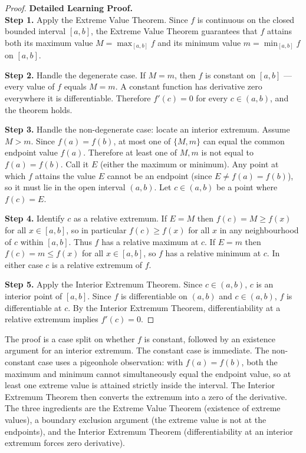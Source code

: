 \begin{proof}
\textbf{Detailed Learning Proof.}~\\

\textbf{Step 1.} Apply the Extreme Value Theorem. Since $f$ is continuous on the closed bounded interval $[a,b]$, the Extreme Value Theorem guarantees that $f$ attains both its maximum value $M = \max_{[a,b]} f$ and its minimum value $m = \min_{[a,b]} f$ on $[a,b]$.

\textbf{Step 2.} Handle the degenerate case. If $M = m$, then $f$ is constant on $[a,b]$ --- every value of $f$ equals $M = m$. A constant function has derivative zero everywhere it is differentiable. Therefore $f'(c) = 0$ for every $c \in (a,b)$, and the theorem holds.

\textbf{Step 3.} Handle the non-degenerate case: locate an interior extremum. Assume $M > m$. Since $f(a) = f(b)$, at most one of $\{M, m\}$ can equal the common endpoint value $f(a)$. Therefore at least one of $M, m$ is not equal to $f(a) = f(b)$. Call it $E$ (either the maximum or minimum). Any point at which $f$ attains the value $E$ cannot be an endpoint (since $E \neq f(a) = f(b)$), so it must lie in the open interval $(a,b)$. Let $c \in (a,b)$ be a point where $f(c) = E$.

\textbf{Step 4.} Identify $c$ as a relative extremum. If $E = M$ then $f(c) = M \geq f(x)$ for all $x \in [a,b]$, so in particular $f(c) \geq f(x)$ for all $x$ in any neighbourhood of $c$ within $[a,b]$. Thus $f$ has a relative maximum at $c$. If $E = m$ then $f(c) = m \leq f(x)$ for all $x \in [a,b]$, so $f$ has a relative minimum at $c$. In either case $c$ is a relative extremum of $f$.

\textbf{Step 5.} Apply the Interior Extremum Theorem. Since $c \in (a,b)$, $c$ is an interior point of $[a,b]$. Since $f$ is differentiable on $(a,b)$ and $c \in (a,b)$, $f$ is differentiable at $c$. By the Interior Extremum Theorem, differentiability at a relative extremum implies $f'(c) = 0$.
\end{proof}

\begin{remark*}
The proof is a case split on whether $f$ is constant, followed by an existence argument for an interior extremum. The constant case is immediate. The non-constant case uses a pigeonhole observation: with $f(a) = f(b)$, both the maximum and minimum cannot simultaneously equal the endpoint value, so at least one extreme value is attained strictly inside the interval. The Interior Extremum Theorem then converts the extremum into a zero of the derivative. The three ingredients are the Extreme Value Theorem (existence of extreme values), a boundary exclusion argument (the extreme value is not at the endpoints), and the Interior Extremum Theorem (differentiability at an interior extremum forces zero derivative).
\end{remark*}

